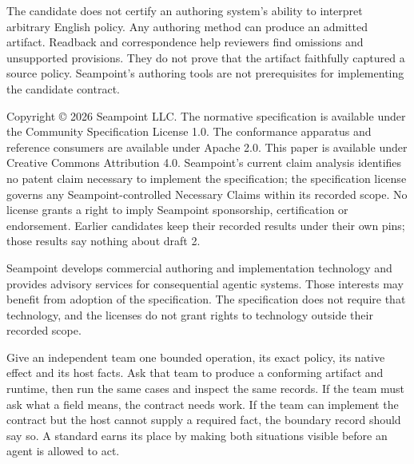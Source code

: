 \documentclass[
  american,
  11pt,
  letterpaper,
]{article}
\begin{document}
The candidate does not certify an authoring system's ability to
interpret arbitrary English policy. Any authoring method can produce an
admitted artifact. Readback and correspondence help reviewers find
omissions and unsupported provisions. They do not prove that the
artifact faithfully captured a source policy. Seampoint's authoring
tools are not prerequisites for implementing the candidate contract.

Copyright © 2026 Seampoint LLC. The normative specification is available
under the Community Specification License 1.0. The conformance apparatus
and reference consumers are available under Apache 2.0. This paper is
available under Creative Commons Attribution 4.0. Seampoint's current
claim analysis identifies no patent claim necessary to implement the
specification; the specification license governs any
Seampoint-controlled Necessary Claims within its recorded scope. No
license grants a right to imply Seampoint sponsorship, certification or
endorsement. Earlier candidates keep their recorded results under their
own pins; those results say nothing about draft 2.

Seampoint develops commercial authoring and implementation technology
and provides advisory services for consequential agentic systems. Those
interests may benefit from adoption of the specification. The
specification does not require that technology, and the licenses do not
grant rights to technology outside their recorded scope.

Give an independent team one bounded operation, its exact policy, its
native effect and its host facts. Ask that team to produce a conforming
artifact and runtime, then run the same cases and inspect the same
records. If the team must ask what a field means, the contract needs
work. If the team can implement the contract but the host cannot supply
a required fact, the boundary record should say so. A standard earns its
place by making both situations visible before an agent is allowed to
act.
\end{document}
